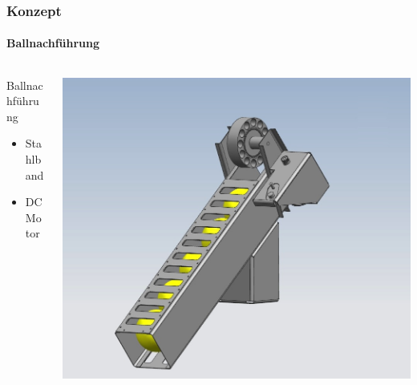 \begin{frame}
	\frametitle{Konzept}
	\framesubtitle{Ballnachführung}
	\begin{columns}
		\begin{column}{0.4\textwidth}
			\begin{block}{Ballnachführung}
				\begin{itemize}
					\item Stahlband
					\item DC Motor
				\end{itemize}
			\end{block}
			\centering
			\rule{0pt}{0.8\textwidth}
		\end{column}
		\begin{column}{0.6\textwidth}
			\centering
			\includegraphics[height=0.8\textwidth, trim = 40mm 0mm 60mm 30mm, clip]{../doc/fig/Balllager.jpg}
		\end{column}
	\end{columns}
\end{frame}
